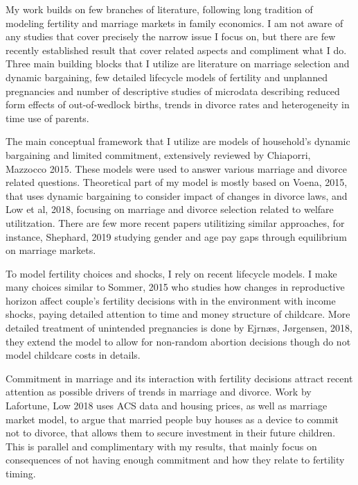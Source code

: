\documentclass[12pt,letter]{article}
\begin{document}
My work builds on few branches of literature, following long tradition of modeling fertility and marriage markets in family economics. I am not aware of any studies that cover precisely the narrow issue I focus on, but there are few recently established result that cover related aspects and compliment what I do. Three main building blocks that I utilize are literature on marriage selection and dynamic bargaining, few detailed lifecycle models of fertility and unplanned pregnancies and number of descriptive studies of microdata describing reduced form effects of out-of-wedlock births, trends in divorce rates and heterogeneity in time use of parents.

The main conceptual framework that I utilize are models of household's dynamic bargaining and limited commitment, extensively reviewed by Chiaporri, Mazzocco 2015.\nocite{chiappori-review} These models were used to answer various marriage and divorce related questions. Theoretical part of my model is mostly based on Voena, 2015\nocite{voena-1}, that uses dynamic bargaining to consider impact of changes in divorce laws, and Low et al, 2018\nocite{low-1}, focusing on marriage and divorce selection related to welfare utilitzation. There are few more recent papers utilitizing similar approaches, for instance, Shephard, 2019\nocite{shephard} studying gender and age pay gaps through equilibrium on marriage markets. 

To model fertility choices and shocks, I rely on recent lifecycle models. I make many choices similar to Sommer, 2015\nocite{sommer} who studies how changes in reproductive horizon affect couple's fertility decisions with in the environment with income shocks, paying detailed attention to time and money structure of childcare. More detailed treatment of unintended pregnancies is done by Ejrnæs, Jørgensen, 2018\nocite{ejrnaes}, they extend the model to allow for non-random abortion decisions though do not model childcare costs in details. 

Commitment in marriage and its interaction with fertility decisions attract recent attention as possible drivers of trends in marriage and divorce. Work by Lafortune, Low 2018\nocite{lafortune-1} uses ACS data and housing prices, as well as marriage market model, to argue that married people buy houses as a device to commit not to divorce, that allows them to secure investment in their future children. This is parallel and complimentary with my results, that mainly focus on consequences of not having enough commitment and how they relate to fertility timing. 
\end{document}
